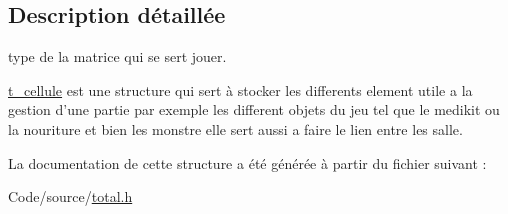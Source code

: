 \subsection{Description détaillée}
type de la matrice qui se sert jouer. 

\hyperlink{structt__cellule}{t\-\_\-cellule} est une structure qui sert à stocker les differents element utile a la gestion d'une partie par exemple les different objets du jeu tel que le medikit ou la nouriture et bien les monstre elle sert aussi a faire le lien entre les salle. 

La documentation de cette structure a été générée à partir du fichier suivant \-:\begin{DoxyCompactItemize}
\item 
Code/source/\hyperlink{total_8h}{total.\-h}\end{DoxyCompactItemize}
